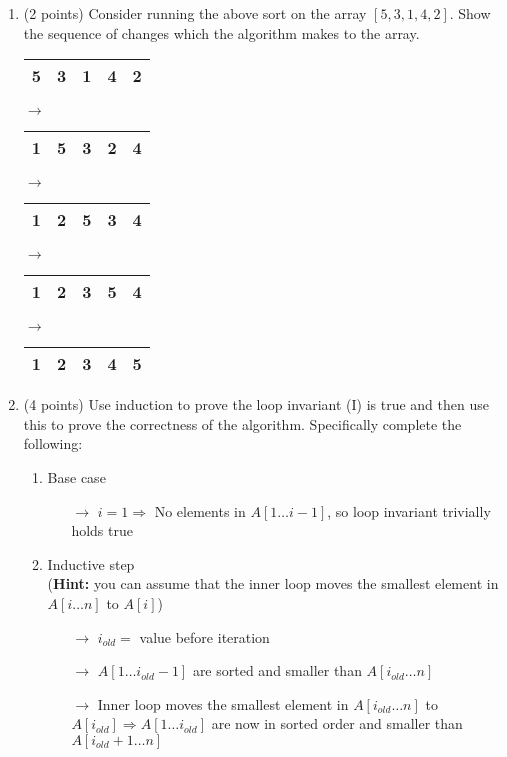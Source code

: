 \documentclass[12pt]{elsart}
\begin{document}
\begin{enumerate}
  \item (2 points) Consider running the above sort on the array $[5,3,1,4,2]$.  Show the sequence of changes which the algorithm makes to the array.
	\begin{tabular}{ |l|l|l|l|l| }
		\hline
		5 & 3 & 1 & 4 & 2\\
		\hline
	\end{tabular}
	$\longrightarrow$
	\begin{tabular}{ |l|l|l|l|l| }
		\hline
		1 & 5 & 3 & 2 & 4\\
		\hline
	\end{tabular}
	$\longrightarrow$
	\begin{tabular}{ |l|l|l|l|l| }
		\hline
		1 & 2 & 5 & 3 & 4\\
		\hline
	\end{tabular}
	$\longrightarrow$\\
	\begin{tabular}{ |l|l|l|l|l| }
		\hline
		1 & 2 & 3 & 5 & 4\\
		\hline
	\end{tabular}
	$\longrightarrow$
	\begin{tabular}{ |l|l|l|l|l| }
		\hline
		1 & 2 & 3 & 4 & 5\\
		\hline
	\end{tabular}
  \item (4 points) Use induction to prove the loop invariant (I) is true and then use this to prove the correctness of the algorithm.  Specifically complete the following:
\begin{enumerate}
   \item Base case
		\begin{itemize}
		\item[$\rightarrow$] $i = 1 \Rightarrow$ No elements in $A[1 \ldots i - 1]$, so loop invariant trivially holds true
		\end{itemize}
\newpage
   \item Inductive step\\  ({\bf Hint:} you can assume that the inner loop moves the smallest element in $A[i \ldots n]$ to $A[i]$)
		\begin{itemize}
		\item[$\rightarrow$] $i_{old} =$ value before iteration
		\item[$\rightarrow$] $A[1 \ldots i_{old} - 1]$ are sorted and smaller than $A[i_{old} \ldots n]$
		\item[$\rightarrow$] Inner loop moves the smallest element in $A[i_{old} \ldots n]$ to $A[i_{old}] \Rightarrow A[1 \ldots i_{old}]$ are now in sorted order and smaller than $A[i_{old} + 1 \ldots n]$

\end{itemize}
\end{enumerate}
\end{enumerate}
\end{document}

